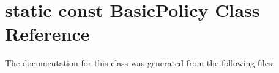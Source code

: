 \hypertarget{classstatic_01const_01BasicPolicy}{}\section{static const Basic\+Policy Class Reference}
\label{classstatic_01const_01BasicPolicy}


The documentation for this class was generated from the following files\+: